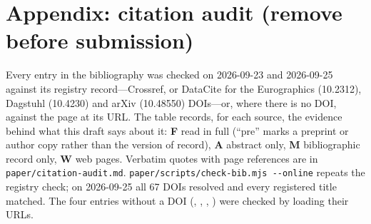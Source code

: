 \section*{Appendix: citation audit (remove before submission)}
\label{sec:audit}

Every entry in the bibliography was checked on 2026-09-23 and 2026-09-25 against its registry
record---Crossref, or DataCite for the Eurographics (10.2312), Dagstuhl
(10.4230) and arXiv (10.48550) DOIs---or, where there is no DOI, against the
page at its URL. The table records, for each source, the evidence behind what
this draft says about it: \textbf{F} read in full (``pre'' marks a preprint or
author copy rather than the version of record), \textbf{A} abstract only,
\textbf{M} bibliographic record only, \textbf{W} web pages. Verbatim quotes with
page references are in \texttt{paper/citation-audit.md}.
\texttt{paper/scripts/check-bib.mjs -{}-online} repeats the registry check; on 2026-09-25 all 67 DOIs resolved and every registered title matched. The four entries without a DOI (, , , ) were checked by loading their URLs.

